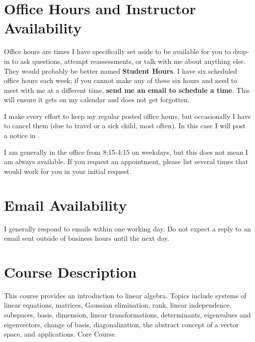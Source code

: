 \documentclass{article}
\begin{document}
\section*{\fontsize{12}{15}\selectfont Office Hours and Instructor Availability}

Office hours are times I have specifically set aside to be available for you to drop-in to ask questions, attempt reassessments, or talk with me about anything else. They would probably be better named \textbf{Student Hours}.  I have six scheduled office hours each week; if you cannot make any of these six hours and need to meet with me at a different time, {\bf send me an email to schedule a time}.  This will ensure it gets on my calendar and does not get forgotten.  

I make every effort to keep my regular posted office hours, but occasionally I have to cancel them (due to travel or a sick child, most often).  In this case I will post a notice in \LMS.

I am generally in the office from 8:15-4:15 on weekdays, but this does not mean I am always available.  If you request an appointment, please list several times that would work for you in your initial request.  

\section*{\fontsize{12}{15}\selectfont Email Availability}
I generally respond to emails within one working day.  Do not expect a reply to an email sent outside of business hours until the next day.

\section*{\fontsize{12}{15}\selectfont Course Description}
This course provides an introduction to linear algebra. Topics include systems of linear equations, matrices, Gaussian elimination, rank, linear independence, subspaces, basis, dimension, linear transformations, determinants, eigenvalues and eigenvectors, change of basis, diagonalization, the abstract concept of a vector space, and applications. Core Course.
\end{document}
